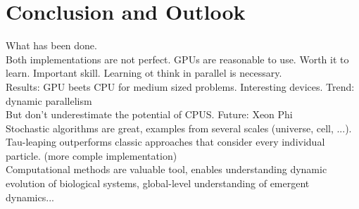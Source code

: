 \chapter{Conclusion and Outlook}
\label{ch:outlook}

What has been done. \\
Both implementations are not perfect. GPUs are reasonable to use. Worth it to learn. Important skill. Learning ot think in parallel is necessary. \\
Results: GPU beets CPU for medium sized problems. Interesting devices. Trend: dynamic parallelism\\
But don't underestimate the potential of CPUS. Future: Xeon Phi \\
Stochastic algorithms are great, examples from several scales (universe, cell, ...). \\
Tau-leaping outperforms classic approaches that consider every individual particle. (more comple implementation) \\
Computational methods are valuable tool, enables understanding dynamic evolution of biological systems, global-level understanding of emergent dynamics... \\